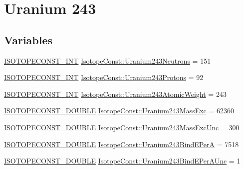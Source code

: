 \hypertarget{group___isotope_const-_uranium-_u243}{}\section{Uranium 243}
\label{group___isotope_const-_uranium-_u243}
\subsection*{Variables}
\begin{DoxyCompactItemize}
\item 
\mbox{\hyperlink{group___isotope_const-_macros_ga5f18360b3e99483a35c32d789e62621c}{I\+S\+O\+T\+O\+P\+E\+C\+O\+N\+S\+T\+\_\+\+I\+NT}} \mbox{\hyperlink{group___isotope_const-_uranium-_u243_ga5c62af5856e857fe1ade7d22e40b331f}{Isotope\+Const\+::\+Uranium243\+Neutrons}} = 151
\item 
\mbox{\hyperlink{group___isotope_const-_macros_ga5f18360b3e99483a35c32d789e62621c}{I\+S\+O\+T\+O\+P\+E\+C\+O\+N\+S\+T\+\_\+\+I\+NT}} \mbox{\hyperlink{group___isotope_const-_uranium-_u243_ga9ee509c3e287720cebdc008455487138}{Isotope\+Const\+::\+Uranium243\+Protons}} = 92
\item 
\mbox{\hyperlink{group___isotope_const-_macros_ga5f18360b3e99483a35c32d789e62621c}{I\+S\+O\+T\+O\+P\+E\+C\+O\+N\+S\+T\+\_\+\+I\+NT}} \mbox{\hyperlink{group___isotope_const-_uranium-_u243_ga1a9b29d530f9efa3ee8f5e9417c34af3}{Isotope\+Const\+::\+Uranium243\+Atomic\+Weight}} = 243
\item 
\mbox{\hyperlink{group___isotope_const-_macros_ga8f45a7272ce02c0b4c65c44636ed719a}{I\+S\+O\+T\+O\+P\+E\+C\+O\+N\+S\+T\+\_\+\+D\+O\+U\+B\+LE}} \mbox{\hyperlink{group___isotope_const-_uranium-_u243_ga0f4a6b79c15d1efcb96264b667cebbb3}{Isotope\+Const\+::\+Uranium243\+Mass\+Exc}} = 62360
\item 
\mbox{\hyperlink{group___isotope_const-_macros_ga8f45a7272ce02c0b4c65c44636ed719a}{I\+S\+O\+T\+O\+P\+E\+C\+O\+N\+S\+T\+\_\+\+D\+O\+U\+B\+LE}} \mbox{\hyperlink{group___isotope_const-_uranium-_u243_ga8325ce7374611211f2d57d87ca89a7fe}{Isotope\+Const\+::\+Uranium243\+Mass\+Exc\+Unc}} = 300
\item 
\mbox{\hyperlink{group___isotope_const-_macros_ga8f45a7272ce02c0b4c65c44636ed719a}{I\+S\+O\+T\+O\+P\+E\+C\+O\+N\+S\+T\+\_\+\+D\+O\+U\+B\+LE}} \mbox{\hyperlink{group___isotope_const-_uranium-_u243_ga48de8d4bc261eb4cb695a55029c4ad02}{Isotope\+Const\+::\+Uranium243\+Bind\+E\+PerA}} = 7518
\item 
\mbox{\hyperlink{group___isotope_const-_macros_ga8f45a7272ce02c0b4c65c44636ed719a}{I\+S\+O\+T\+O\+P\+E\+C\+O\+N\+S\+T\+\_\+\+D\+O\+U\+B\+LE}} \mbox{\hyperlink{group___isotope_const-_uranium-_u243_gaa22741e92fe9ae4bc58a0b861e174d03}{Isotope\+Const\+::\+Uranium243\+Bind\+E\+Per\+A\+Unc}} = 1

\end{DoxyCompactItemize}
